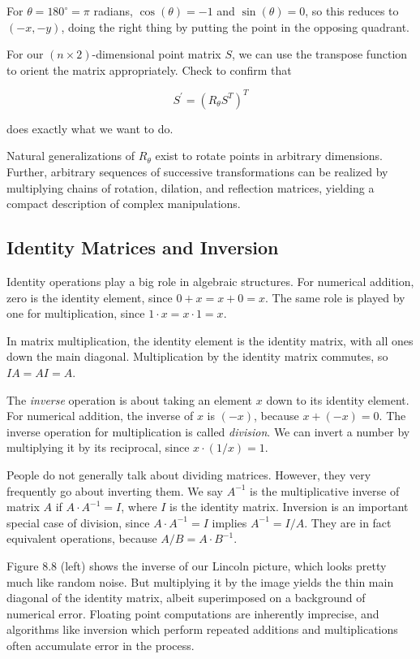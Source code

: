 \documentclass[10pt]{article}
\begin{document}
For \(\theta = 180^{\circ} = \pi\) radians, \(\cos (\theta) = -1\) and \(\sin (\theta) = 0\), so this reduces to \((-x,-y)\), doing the right thing by putting the point in the opposing quadrant.

For our \((n \times 2)\)-dimensional point matrix \(S\), we can use the transpose function to orient the matrix appropriately. Check to confirm that

\[
S^{\prime} = \left(R_{\theta} S^{T}\right)^{T}
\]

does exactly what we want to do.

Natural generalizations of \(R_{\theta}\) exist to rotate points in arbitrary dimensions. Further, arbitrary sequences of successive transformations can be realized by multiplying chains of rotation, dilation, and reflection matrices, yielding a compact description of complex manipulations.

\subsection*{Identity Matrices and Inversion}
Identity operations play a big role in algebraic structures. For numerical addition, zero is the identity element, since \(0+x=x+0=x\). The same role is played by one for multiplication, since \(1 \cdot x=x \cdot 1=x\).

In matrix multiplication, the identity element is the identity matrix, with all ones down the main diagonal. Multiplication by the identity matrix commutes, so \(IA=AI=A\).

The \textit{inverse} operation is about taking an element \(x\) down to its identity element. For numerical addition, the inverse of \(x\) is \((-x)\), because \(x+(-x)=0\). The inverse operation for multiplication is called \textit{division}. We can invert a number by multiplying it by its reciprocal, since \(x \cdot(1 / x)=1\).

People do not generally talk about dividing matrices. However, they very frequently go about inverting them. We say \(A^{-1}\) is the multiplicative inverse of matrix \(A\) if \(A \cdot A^{-1}=I\), where \(I\) is the identity matrix. Inversion is an important special case of division, since \(A \cdot A^{-1}=I\) implies \(A^{-1}=I / A\). They are in fact equivalent operations, because \(A / B=A \cdot B^{-1}\).

Figure 8.8 (left) shows the inverse of our Lincoln picture, which looks pretty much like random noise. But multiplying it by the image yields the thin main diagonal of the identity matrix, albeit superimposed on a background of numerical error. Floating point computations are inherently imprecise, and algorithms like inversion which perform repeated additions and multiplications often accumulate error in the process.
\end{document}

